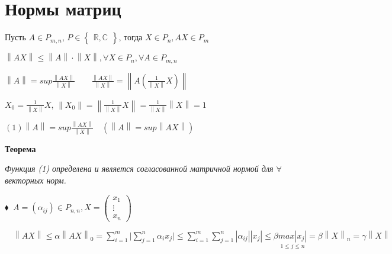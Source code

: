 \documentclass[a4paper, 12pt]{report}
\begin{document}
	
	
	
	
	
	
	\section{Нормы матриц}
	\quad\; Пусть $A\in P_{m,n}$, $P\in \begin{Bmatrix}\mathbb{R}, \mathbb{C}\end{Bmatrix}$, тогда $X\in P_n, AX \in P_m$
	\par\bigskip
	$\left \| AX \right \| \leqslant  \left \| A \right \|\cdot \left \| X \right \|, \forall X \in P_n, \forall A \in P_{m,n}$
	\par\bigskip
	$\left \| A \right \|= sup \frac{\left \| AX \right \|}{\left \| X \right \|}\qquad \frac{\left \| AX \right \|}{\left \| X \right \|}=\left \| A\left ( \frac{1}{\left \| X \right \|}X\right) \right \|$
	\par\bigskip
	$X_0=\frac{1}{\left \|  X\right \|}X$, $\left \| X_0 \right \|=\left \| \frac{1}{\left \|X\right \|}X \right \|=\frac{1}{\left \|X\right \|}\left \| X \right \|=1$
	\par\bigskip
	$(1)\left \| A \right \|=sup\frac{\left \| AX \right \|}{\left \| X \right \|}\quad(\left \| A \right \|=sup\left \| AX \right \|)$
	
	\par\bigskip
	\textbf{Теорема}
	
	\textit{Функция (1) определена и является согласованной матричной нормой для $\forall$ векторных норм.}
	\par\bigskip
	$\blacklozenge\ $
	$A=(\alpha_{ij})\in P_{n,n}, X=\begin{pmatrix}x_1\\ \vdots \\ x_n\end{pmatrix}$
	
	$\quad\left \| AX \right \|\leqslant \alpha \left \| AX \right \|_0=\sum\limits_{i=1}^{m}{|\sum\limits_{j=1}^{n}{\alpha_ix_j|}}\leqslant \sum\limits_{i=1}^{m}{\sum\limits_{j=1}^{n}{|\alpha_{ij}||x_j|}}\leqslant \beta\underset{1 \leqslant j \leqslant n}{max|x_j|}=\beta\left \| X \right \|_n=\gamma\left \| X \right \|$
	
\end{document}
